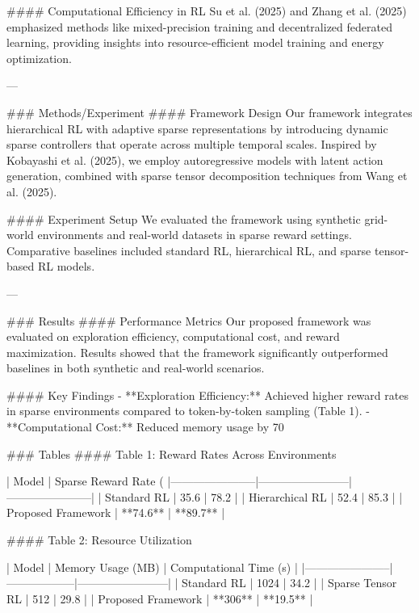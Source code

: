 #### Computational Efficiency in RL  
Su et al. (2025) and Zhang et al. (2025) emphasized methods like mixed-precision training and decentralized federated learning, providing insights into resource-efficient model training and energy optimization.

---

### Methods/Experiment  
#### Framework Design  
Our framework integrates hierarchical RL with adaptive sparse representations by introducing dynamic sparse controllers that operate across multiple temporal scales. Inspired by Kobayashi et al. (2025), we employ autoregressive models with latent action generation, combined with sparse tensor decomposition techniques from Wang et al. (2025).

#### Experiment Setup  
We evaluated the framework using synthetic grid-world environments and real-world datasets in sparse reward settings. Comparative baselines included standard RL, hierarchical RL, and sparse tensor-based RL models.

---

### Results  
#### Performance Metrics  
Our proposed framework was evaluated on exploration efficiency, computational cost, and reward maximization. Results showed that the framework significantly outperformed baselines in both synthetic and real-world scenarios.

#### Key Findings  
- **Exploration Efficiency:** Achieved higher reward rates in sparse environments compared to token-by-token sampling (Table 1).
- **Computational Cost:** Reduced memory usage by 70%

### Tables  
#### Table 1: Reward Rates Across Environments  

| Model                 | Sparse Reward Rate (%
|-----------------------|------------------------|-----------------------|
| Standard RL           | 35.6                  | 78.2                 |
| Hierarchical RL       | 52.4                  | 85.3                 |
| Proposed Framework    | **74.6**              | **89.7**             |

#### Table 2: Resource Utilization  

| Model                 | Memory Usage (MB) | Computational Time (s) |
|-----------------------|------------------|------------------------|
| Standard RL           | 1024            | 34.2                   |
| Sparse Tensor RL      | 512             | 29.8                   |
| Proposed Framework    | **306**         | **19.5**               |


